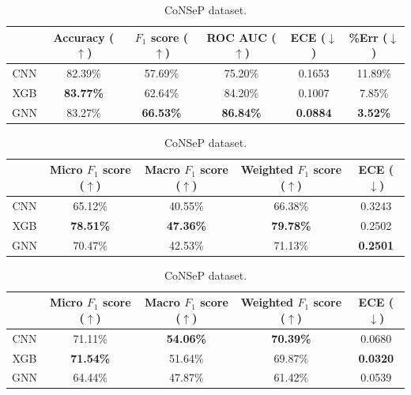 \begin{table}[ht]
    \centering
    \caption{Result of the GNN vs XGBoost experiment.}

    \begin{tabular}{c|c|c|c|c|c|}
  \cline{2-6}
  & Accuracy ($\uparrow$) & $F_1$ score ($\uparrow$) & ROC AUC ($\uparrow$) & ECE ($\downarrow$) & \%Err ($\downarrow$) \\ \hline
  \multicolumn{1}{|c|}{CNN}  & 82.39\% & 57.69\% & 75.20\% & 0.1653 & 11.89\% \\ \hline
\multicolumn{1}{|c|}{XGB}  & \textbf{83.77\%} & 62.64\% & 84.20\% & 0.1007 & 7.85\% \\ \hline
\multicolumn{1}{|c|}{GNN}  & 83.27\% & \textbf{66.53\%} & \textbf{86.84\%} & \textbf{0.0884} & \textbf{3.52\%} \\ \hline
\end{tabular}
\caption{DigiPatics lung dataset.}

\vspace{0.5cm}

\begin{tabular}{c|c|c|c|c|}
  \cline{2-5}
  & Micro $F_1$ score ($\uparrow$) & Macro $F_1$ score ($\uparrow$) & Weighted $F_1$ score ($\uparrow$) & ECE ($\downarrow$)  \\ \hline
  \multicolumn{1}{|c|}{CNN}  & 65.12\% & 40.55\% & 66.38\% & 0.3243 \\ \hline
\multicolumn{1}{|c|}{XGB}  & \textbf{78.51\%} & \textbf{47.36\%} & \textbf{79.78\%} & 0.2502   \\ \hline
\multicolumn{1}{|c|}{GNN}  & 70.47\% & 42.53\% & 71.13\% & \textbf{0.2501}   \\ \hline
\end{tabular}
\caption{DigiPatics breast dataset.}

\vspace{0.5cm}

    \begin{tabular}{c|c|c|c|c|}
  \cline{2-5}
  & Micro $F_1$ score ($\uparrow$) & Macro $F_1$ score ($\uparrow$) & Weighted $F_1$ score ($\uparrow$) & ECE ($\downarrow$) \\ \hline
  \multicolumn{1}{|c|}{CNN}  & 71.11\% & \textbf{54.06\%} & \textbf{70.39\%} & 0.0680 \\ \hline
\multicolumn{1}{|c|}{XGB}  & \textbf{71.54\%} & 51.64\% & 69.87\% & \textbf{0.0320} \\ \hline
\multicolumn{1}{|c|}{GNN}  & 64.44\% & 47.87\% & 61.42\% & 0.0539  \\ \hline
\end{tabular}
\caption{CoNSeP dataset.}


\end{table}
